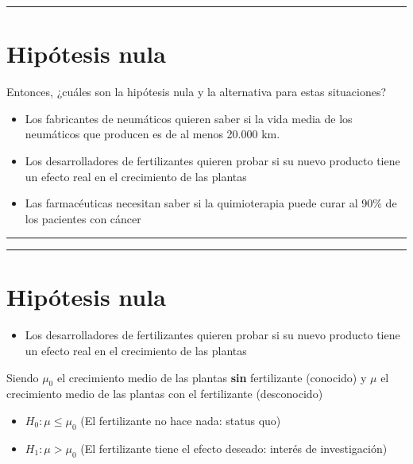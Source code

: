 \documentclass[
]{book}
\providecommand{\tightlist}{%
  \setlength{\itemsep}{0pt}\setlength{\parskip}{0pt}}
\begin{document}
\begin{center}\rule{0.5\linewidth}{0.5pt}\end{center}

\hypertarget{hipuxf3tesis-nula}{%
\section{Hipótesis nula}\label{hipuxf3tesis-nula}}

Entonces, ¿cuáles son la hipótesis nula y la alternativa para estas situaciones?

\begin{itemize}
\item
  Los fabricantes de neumáticos quieren saber si la vida media de los neumáticos que producen es de al menos 20.000 km.
\item
  Los desarrolladores de fertilizantes quieren probar si su nuevo producto tiene un efecto real en el crecimiento de las plantas
\item
  Las farmacéuticas necesitan saber si la quimioterapia puede curar al 90\% de los pacientes con cáncer
\end{itemize}

\begin{center}\rule{0.5\linewidth}{0.5pt}\end{center}

\begin{center}\rule{0.5\linewidth}{0.5pt}\end{center}

\hypertarget{hipuxf3tesis-nula-1}{%
\section{Hipótesis nula}\label{hipuxf3tesis-nula-1}}

\begin{itemize}
\tightlist
\item
  Los desarrolladores de fertilizantes quieren probar si su nuevo producto tiene un efecto real en el crecimiento de las plantas
\end{itemize}

Siendo \(\mu_0\) el crecimiento medio de las plantas \textbf{sin} fertilizante (conocido) y \(\mu\) el crecimiento medio de las plantas con el fertilizante (desconocido)

\begin{itemize}
\tightlist
\item
  \(H_0:\mu \leq \mu_0\) (El fertilizante no hace nada: status quo)
\item
  \(H_1:\mu > \mu_0\) (El fertilizante tiene el efecto deseado: interés de investigación)
\end{itemize}
\end{document}
